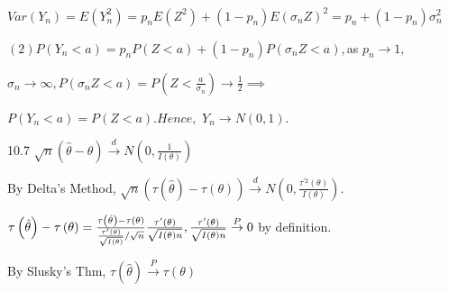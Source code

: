 \documentclass{article}
\begin{document}
$Var\left( Y_{n}\right) =E\left( Y_{n}^{2}\right) =p_{n}E\left( Z^{2}\right)
+\left( 1-p_{n}\right) E\left( \sigma _{n}Z\right) ^{2}=p_{n}+\left(
1-p_{n}\right) \sigma _{n}^{2}$

$\left( 2\right) P\left( Y_{n}<a\right) =p_{n}P\left( Z<a\right) +\left(
1-p_{n}\right) P\left( \sigma _{n}Z<a\right) ,$as $p_{n}\rightarrow 1,$

$\sigma _{n}\rightarrow \infty ,P\left( \sigma _{n}Z<a\right) =P\left( Z<%
\frac{a}{\sigma _{n}}\right) \rightarrow \frac{1}{2}\implies $

$P\left( Y_{n}<a\right) =P\left( Z<a\right) .Hence,$ $Y_{n}\rightarrow
N\left( 0,1\right) .$

10.7 $\sqrt{n}\left( \hat{\theta}-\theta \right) \overset{d}{\rightarrow }%
N\left( 0,\frac{1}{I\left( \theta \right) }\right) $

By Delta's Method, $\sqrt{n}\left( \tau \left( \hat{\theta}\right) -\tau
\left( \theta \right) \right) \overset{d}{\rightarrow }N\left( 0,\frac{\tau
^{\prime 2}\left( \theta \right) }{I\left( \theta \right) }\right) .$

$\tau \left( \hat{\theta}\right) -\tau \left( \theta \right) =\frac{\tau
\left( \hat{\theta}\right) -\tau \left( \theta \right) }{\frac{\tau ^{\prime
}\left( \theta \right) }{\sqrt{I\left( \theta \right) }}/\sqrt{n}}\frac{\tau
^{\prime }\left( \theta \right) }{\sqrt{I\left( \theta \right) n}},\frac{%
\tau ^{\prime }\left( \theta \right) }{\sqrt{I\left( \theta \right) n}}%
\overset{P}{\rightarrow }0$ by definition. 

By Slusky's Thm, $\tau \left( \hat{\theta}\right) \overset{P}{\rightarrow }%
\tau \left( \theta \right) $
\end{document}

